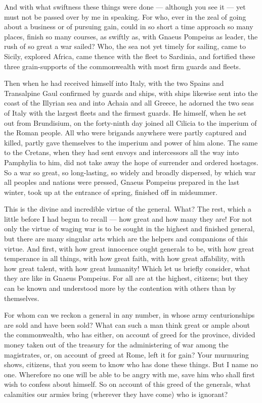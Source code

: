  And with what swiftness these things were done --- although you see it --- yet must not be passed over by me in speaking. For who, ever in the zeal of going about a business or of pursuing gain, could in so short a time approach so many places, finish so many courses, as swiftly as, with Gnaeus Pompeius as leader, the rush of so great a war sailed? Who, the sea not yet timely for sailing, came to Sicily, explored Africa, came thence with the fleet to Sardinia, and fortified these three grain-supports of the commonwealth with most firm guards and fleets.

 Then when he had received himself into Italy, with the two Spains and Transalpine Gaul confirmed by guards and ships, with ships likewise sent into the coast of the Illyrian sea and into Achaia and all Greece, he adorned the two seas of Italy with the largest fleets and the firmest guards. He himself, when he set out from Brundisium, on the forty-ninth day joined all Cilicia to the imperium of the Roman people. All who were brigands anywhere were partly captured and killed, partly gave themselves to the imperium and power of him alone. The same to the Cretans, when they had sent envoys and intercessors all the way into Pamphylia to him, did not take away the hope of surrender and ordered hostages. So a war so great, so long-lasting, so widely and broadly dispersed, by which war all peoples and nations were pressed, Gnaeus Pompeius prepared in the last winter, took up at the entrance of spring, finished off in midsummer.

 This is the divine and incredible virtue of the general. What? The rest, which a little before I had begun to recall --- how great and how many they are! For not only the virtue of waging war is to be sought in the highest and finished general, but there are many singular arts which are the helpers and companions of this virtue. And first, with how great innocence ought generals to be, with how great temperance in all things, with how great faith, with how great affability, with how great talent, with how great humanity! Which let us briefly consider, what they are like in Gnaeus Pompeius. For all are at the highest, citizens; but they can be known and understood more by the contention with others than by themselves.

 For whom can we reckon a general in any number, in whose army centurionships are sold and have been sold? What can such a man think great or ample about the commonwealth, who has either, on account of greed for the province, divided money taken out of the treasury for the administering of war among the magistrates, or, on account of greed at Rome, left it for gain? Your murmuring shows, citizens, that you seem to know who has done these things. But I name no one. Wherefore no one will be able to be angry with me, save him who shall first wish to confess about himself. So on account of this greed of the generals, what calamities our armies bring (wherever they have come) who is ignorant?

